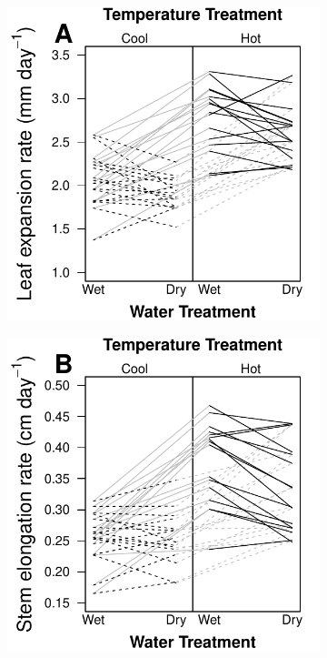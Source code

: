 \documentclass[11pt, oneside]{article}
\begin{document}
\begin{figure}
\centering
    \begin{subfigure}{.4\textwidth}
        \centering
        \includegraphics[width=\linewidth]{Figures/FigureS_LERrxnNorm.pdf}
        \label{fig:FigS_LERrxnNorm}
    \end{subfigure} %
    \begin{subfigure}{.4\textwidth}
        \centering
        \includegraphics[width=\linewidth]{Figures/FigureS_SERrxnNorm.pdf}

\end{subfigure}
\end{figure}
\end{document}
